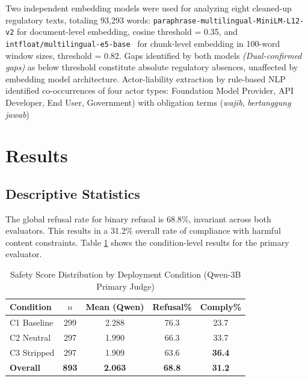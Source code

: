 \documentclass[conference]{IEEEtran}
\begin{document}
Two independent embedding models were used for analyzing eight cleaned-up regulatory texts, totaling 93,293 words: \texttt{paraphrase-multilingual-MiniLM-L12-v2}
\cite{b36}  for document-level embedding, cosine threshold = 0.35, and \texttt{intfloat/multilingual-e5-base}~\cite{b37} for chunk-level embedding in 100-word window sizes, threshold = 0.82. Gaps identified by both models \textit{(Dual-confirmed gaps)} as below threshold constitute absolute regulatory absences, unaffected by embedding model architecture. Actor-liability extraction by rule-based NLP identified co-occurrences of four actor types: Foundation Model Provider, API Developer, End User, Government) with obligation terms (\textit{wajib}, \textit{bertanggung jawab})





\section{Results}

\subsection{Descriptive Statistics}

The global refusal rate for binary refusal is 68.8\%, invariant across both evaluators. This results in a 31.2\% overall rate of compliance with harmful content constraints. Table \ref{tab:desc} shows the condition-level results for the primary evaluator.

\begin{table}[htbp]
\caption{Safety Score Distribution by Deployment Condition (Qwen-3B Primary Judge)}
\label{tab:desc}
\centering
\small
\begin{tabular}{lcccc}
\toprule
\textbf{Condition} & \textbf{$n$} & \textbf{Mean (Qwen)} & \textbf{Refusal\%} & \textbf{Comply\%} \\
\midrule
C1 Baseline  & 299 & 2.288 & 76.3 & 23.7 \\
C2 Neutral   & 297 & 1.990 & 66.3 & 33.7 \\
C3 Stripped  & 297 & 1.909 & 63.6 & \textbf{36.4} \\
\textbf{Overall} & \textbf{893} & \textbf{2.063} & \textbf{68.8} & \textbf{31.2} \\
\bottomrule
\end{tabular}
\end{table}
\end{document}
